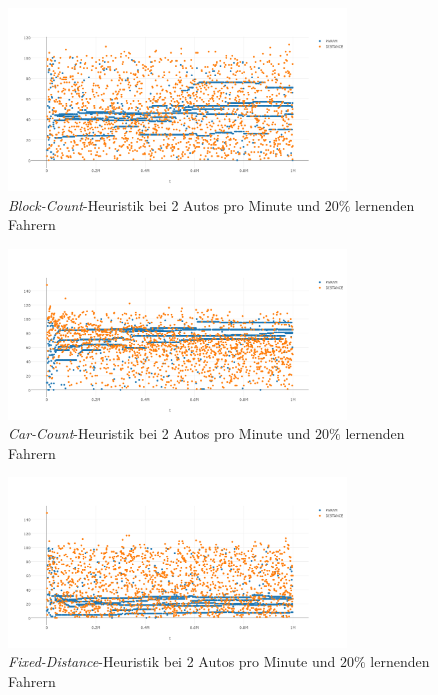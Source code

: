 \begin{figure}[H]
	\includegraphics[width=0.8\textwidth]{analyse/SomeMutants/2pm/block2some.png}
	\caption{\emph{Block-Count}-Heuristik bei 2 Autos pro Minute und $20\%$ lernenden Fahrern}\label{fig:ap_pm_bs_2}
\end{figure}
\begin{figure}[H]
	\includegraphics[width=0.8\textwidth]{analyse/SomeMutants/2pm/car2some.png}
	\caption{\emph{Car-Count}-Heuristik bei 2 Autos pro Minute und $20\%$ lernenden Fahrern}\label{fig:ap_pm_cc_2}
\end{figure}
\begin{figure}[H]
	\includegraphics[width=0.8\textwidth]{analyse/SomeMutants/2pm/fixed2some.png}
	\caption{\emph{Fixed-Distance}-Heuristik bei 2 Autos pro Minute und $20\%$ lernenden Fahrern}\label{fig:ap_pm_fd_2}
\end{figure}
